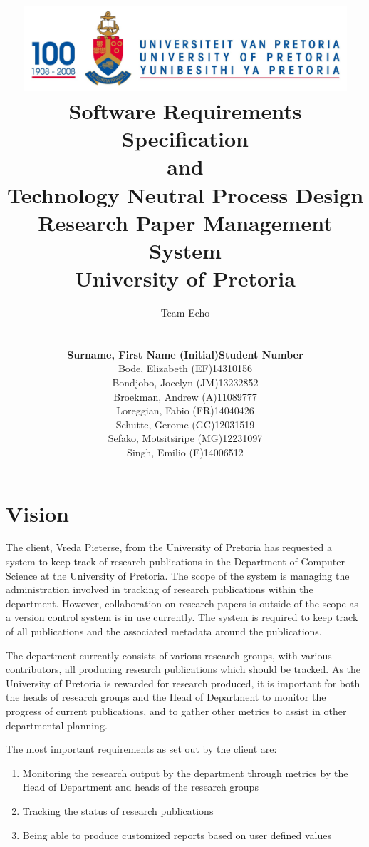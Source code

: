 \documentclass[a4paper,10pt]{article}
\title{\includegraphics[width=12cm]{Eeufeeslogo.jpg} \\
       Software Requirements Specification \\ 
       and \\
       Technology Neutral Process Design \\
       Research Paper Management System \\
       \vspace{0.5cm}
       University of Pretoria \\
       \vspace{1.0cm}
       }
\date{}
\author{Team Echo\\
	\vspace{0.5cm} \\
	\begin{tabu} to \textwidth { X[l] X[l]}
		\hline
		\textbf{Surname, First Name (Initial)}	& \textbf{Student Number}	\\ \hline \hline
		Bode, Elizabeth (EF)			& 14310156		\\ \hline
		Bondjobo, Jocelyn (JM)		& 13232852		\\ \hline
		Broekman, Andrew (A)		& 11089777		\\ \hline
		Loreggian, Fabio (FR)			& 14040426		\\ \hline
		Schutte, Gerome (GC)		& 12031519		\\ \hline
		Sefako, Motsitsiripe (MG)		& 12231097		\\ \hline
		Singh, Emilio (E)			& 14006512		\\ \hline
		\hline
	\end{tabu}}
\begin{document}
\maketitle
\thispagestyle{empty}
\clearpage

\newpage
{}
\thispagestyle{empty}
\tableofcontents
\clearpage

\newpage
{}

\section{Vision}
The client, Vreda Pieterse, from the University of Pretoria has requested a system to keep track of research publications in the Department of Computer Science at the University of Pretoria. The scope of the system is managing the administration involved in tracking of research publications within the department. However, collaboration on research papers is outside of the scope as a version control system is in use currently. The system is required to keep track of all publications and the associated metadata around the publications.

The department currently consists of various research groups, with various contributors, all producing research publications which should be tracked. As the University of Pretoria is rewarded for research produced, it is important for both the heads of research groups and the Head of Department to monitor the progress of current publications, and to gather other metrics to assist in other departmental planning.

The most important requirements as set out by the client are:
\begin{enumerate}
\item Monitoring the research output by the department through metrics by the Head of Department and heads of the research groups
\item Tracking the status of research publications
\item Being able to produce customized reports based on user defined values
\end{enumerate}
\end{document}
